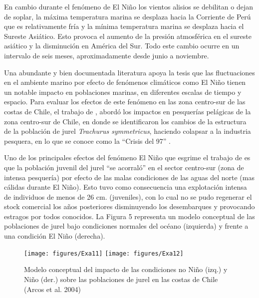 \documentclass{sydneythesis}
\begin{document}
En cambio durante el fenómeno de El Niño los vientos alisios se debilitan o dejan de soplar, la máxima temperatura marina se desplaza hacia la Corriente de Perú que es relativamente fría y la mínima temperatura marina se desplaza hacia el Sureste Asiático. Esto provoca el aumento de la presión atmosférica en el sureste asiático y la disminución en América del Sur. Todo este cambio ocurre en un intervalo de seis meses, aproximadamente desde junio a noviembre.

Una abundante y bien documentada literatura apoya la tesis que las fluctuaciones en el ambiente marino por efecto de fenómenos climáticos como El Niño tienen un notable impacto en poblaciones marinas, en diferentes escalas de tiempo y espacio. Para evaluar los efectos de este fenómeno en las zona centro-sur de las costas de Chile, el trabajo de \autocite{Arcos2004}, abordó los impactos en pesquerías pelágicas de la zona centro-sur de Chile, en donde se identificaron los cambios de la estructura de la población de jurel \emph{Trachurus symmetricus}, haciendo colapsar a la industria pesquera, en lo que se conoce como la ``Crisis del 97'' \autocite{Arcos2004}.

Uno de los principales efectos del fenómeno El Niño que esgrime el trabajo de \autocite{Arcos2004} es que la población juvenil del jurel ``se acorraló'' en el sector centro-sur (zona de intensa pesquería) por efecto de las malas condiciones de las aguas del norte (mas cálidas durante El Niño). Esto tuvo como consecuencia una explotación intensa de individuos de menos de 26 cm. (juveniles), con lo cual no se pudo regenerar el stock comercial los años posteriores disminuyendo los desembarques y provocando estragos por todos conocidos. La Figura 5 representa un modelo conceptual de las poblaciones de jurel bajo condiciones normales del océano (izquierda) y frente a una condición El Niño (derecha).

\begin{figure}

{\centering \texttt{[image: figures/Exa11]} \texttt{[image: figures/Exa12]} 

}

\caption{Modelo conceptual del impacto de las condiciones no Niño (izq.) y Niño (der.) sobre las poblaciones de jurel en las costas de Chile (Arcos et al. 2004)}\label{fig:unnamed-chunk-5}
\end{figure}
\end{document}
